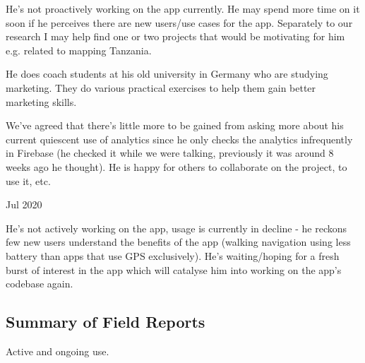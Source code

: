 He's not proactively working on the app currently. He may spend more time on it soon if he perceives there are new users/use cases for the app. Separately to our research I may help find one or two projects that would be motivating for him e.g. related to mapping Tanzania.

He does coach students at his old university in Germany who are studying marketing. They do various practical exercises to help them gain better marketing skills. 

We've agreed that there's little more to be gained from asking more about his current quiescent use of analytics since he only checks the analytics infrequently in Firebase (he checked it while we were talking, previously it was around 8 weeks ago he thought). He is happy for others to collaborate on the project, to use it, etc.

 Jul 2020

He's not actively working on the app, usage is currently in decline - he reckons few new users understand the benefits of the app (walking navigation using less battery than apps that use GPS exclusively). He's waiting/hoping for a fresh burst of interest in the app which will catalyse him into working on the app's codebase again. 

\subsection{Summary of Field Reports}
Active and ongoing use. 

